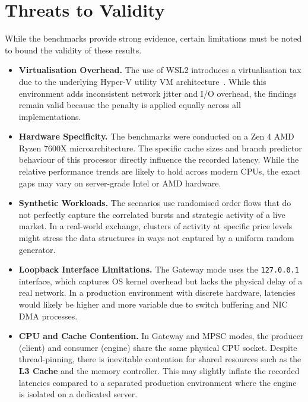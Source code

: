 \section{Threats to Validity}
\label{sec:threats_to_validity}

While the benchmarks provide strong evidence, certain limitations must be noted 
to bound the validity of these results. 

\begin{itemize}
    \item \textbf{Virtualisation Overhead.}
        The use of WSL2 introduces a virtualisation tax due to the underlying 
        Hyper-V utility VM architecture~\citep{microsoft_wsl2_arch}. 
        While this environment adds inconsistent network jitter and I/O 
        overhead, the findings remain valid because 
        the penalty is applied equally across all implementations. 

    \item \textbf{Hardware Specificity.}
        The benchmarks were conducted on a Zen 4 AMD Ryzen 7600X 
        microarchitecture. 
        The specific cache sizes and branch predictor behaviour of this processor 
        directly influence the recorded latency. 
        While the relative performance trends are likely to hold across modern 
        CPUs, the exact gaps may vary on server-grade Intel or AMD hardware. 

    \item \textbf{Synthetic Workloads.}
        The scenarios use randomised order flows that do not perfectly capture 
        the correlated bursts and strategic activity of a live market. 
        In a real-world exchange, clusters of activity at specific price levels 
        might stress the data structures in ways not captured by a uniform 
        random generator. 

    \item \textbf{Loopback Interface Limitations.}
        The Gateway mode uses the \texttt{127.0.0.1} interface, which 
        captures OS kernel overhead but lacks the physical delay of a 
        real network. In a production environment with discrete hardware, 
        latencies would likely be higher and more variable due to switch 
        buffering and NIC DMA processes.

    \item \textbf{CPU and Cache Contention.}
        In Gateway and MPSC modes, the producer (client) and consumer 
        (engine) share the same physical CPU socket. Despite thread-pinning, 
        there is inevitable contention for shared resources such as the 
        \textbf{L3 Cache} and the memory controller. This may slightly 
        inflate the recorded latencies compared to a separated production 
        environment where the engine is isolated on a dedicated server.


\end{itemize}
